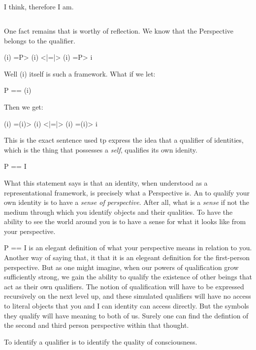 \documentclass[runningheads]{llncs}
\begin{document}
\setcounter{definition}{1}
\begin{assertion}
I think, therefore I am.
\end{assertion}

\subsection{}

One fact remains that is worthy of reflection. We know that the Perspective belongs to the qualifier. 

(i) =P> (i) <|=|> (i) =P> i

Well (i) itself is such a framework. What if we let: 

P == (i)

Then we get:

(i) =(i)> (i) <|=|> (i) =(i)> i

This is the exact sentence used tp express the idea that a qualifier of identities, which is the thing that possesses a \emph{self}, qualifies its own idenity. 

P == I

What this statement says is that an identity, when understood as a representational framework, is precisely what a Perspective is. An to qualify your own identity is to have a \emph{sense of perspective}. After all, what is a \emph{sense} if not the medium through which you identify objects and their qualities. To have the ability to see the world around you is to have a sense for what it looks like from your perspective. 

P == I is an elegant definition of what your perspective means in relation to you. Another way of saying that, it that it is an elegeant definition for the first-person perspective. But as one might imagine, when our powers of qualification grow sufficiently strong, we gain the ability to qualify the existence of other beings that act as their own qualifiers. The notion of qualification will have to be expressed recursively on the next level up, and these simulated qualifiers will have no access to literal objects that you and I can identity can access directly. But the symbols they qualify will have meaning to both of us. Surely one can find the defintion of the second and third person perspective within that thought. 


\setcounter{definition}{1}
\begin{assertion}
	To identify a qualifier is to identify the quality of consciousness.  
\end{assertion}
\end{document}
